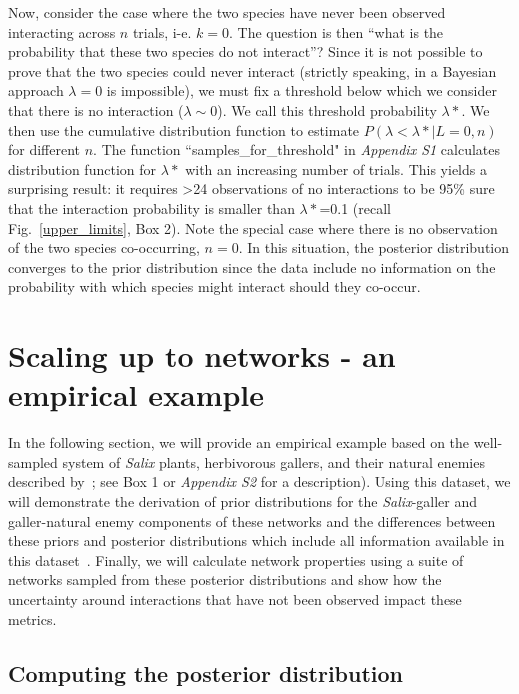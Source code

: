 \documentclass[12pt]{article}
\begin{document}
\begin{spacing}{2.0}
    Now, consider the case where the two species have never been observed interacting across $n$ trials, i-e. $k=0$. The question is then ``what is the probability that these two species do not interact''? Since it is not possible to prove that the two species could never interact (strictly speaking, in a Bayesian approach $\lambda=0$ is impossible), we must fix a threshold below which we consider that there is no interaction ($\lambda \sim 0$). We call this threshold probability $\lambda*$. We then use the cumulative distribution function to estimate $P(\lambda<\lambda*|L=0,n)$ for different $n$. The function ``samples\_for\_threshold" in \emph{Appendix S1} calculates distribution function for $\lambda*$ with an increasing number of trials. This yields a surprising result: it requires \textgreater24 observations of no interactions to be 95\% sure that the interaction probability is smaller than $\lambda*$=0.1 (recall Fig.~\ref{upper_limits}, Box 2). Note the special case where there is no observation of the two species co-occurring, $n = 0$.  In this situation, the posterior distribution converges to the prior distribution since the data include no information on the probability with which species might interact should they co-occur.


\section*{Scaling up to networks - an empirical example}


    In the following section, we will provide an empirical example based on the well-sampled system of \emph{Salix}  plants, herbivorous gallers, and their natural enemies described by~\citet{Kopelke2017}; see Box 1 or \emph{Appendix S2} for a description). Using this dataset, we will demonstrate the derivation of prior distributions for the \emph{Salix}-galler and galler-natural enemy components of these networks and the differences between these priors and posterior distributions which include all information available in this dataset~\citep{Kopelke2017}. Finally, we will calculate network properties using a suite of networks sampled from these posterior distributions and show how the uncertainty around interactions that have not been observed impact these metrics. 


  \subsection*{Computing the posterior distribution}


\end{spacing}
\end{document}
